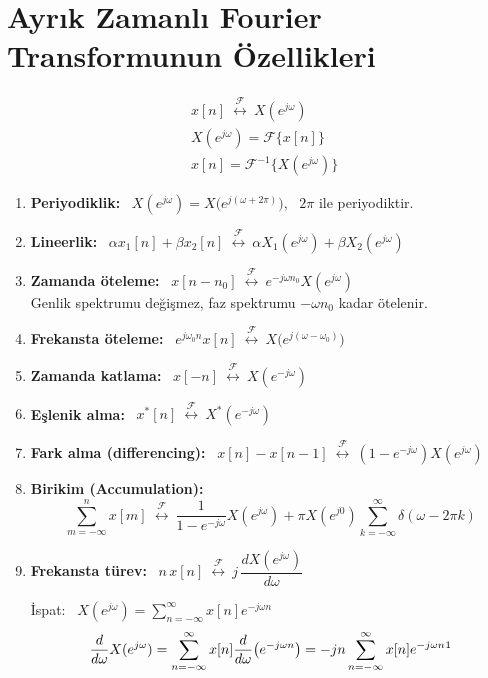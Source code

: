 \documentclass[11pt,a4paper]{article}
\begin{document}
\section{Ayrık Zamanlı Fourier Transformunun Özellikleri}
\begin{align*}
  &x[n]\ \overset{\mathcal{F}}{\longleftrightarrow}\ X(e^{j\omega})\\
  &X(e^{j\omega})=\mathcal{F}\{x[n]\}\\
  &x[n]=\mathcal{F}^{-1}\{X(e^{j\omega})\}
\end{align*}
\begin{enumerate}[label=\arabic*)]
  \item \textbf{Periyodiklik:} \ $X(e^{j\omega})=X\bigl(e^{j(\omega+2\pi)}\bigr)$, \ $2\pi$ ile periyodiktir.
  \item \textbf{Lineerlik:} \ $\alpha x_1[n]+\beta x_2[n]\ \overset{\mathcal{F}}{\longleftrightarrow}\ \alpha X_1(e^{j\omega})+\beta X_2(e^{j\omega})$
  \item \textbf{Zamanda öteleme:} \ $x[n-n_0]\ \overset{\mathcal{F}}{\longleftrightarrow}\ e^{-j\omega n_0}X(e^{j\omega})$\\
    Genlik spektrumu değişmez, faz spektrumu $-\omega n_0$ kadar ötelenir.
  \item \textbf{Frekansta öteleme:} \ $e^{j\omega_0n}x[n]\ \overset{\mathcal{F}}{\longleftrightarrow}\ X\bigl(e^{j(\omega-\omega_0)}\bigr)$
  \item \textbf{Zamanda katlama:} \ $x[-n]\ \overset{\mathcal{F}}{\longleftrightarrow}\ X(e^{-j\omega})$
  \item \textbf{Eşlenik alma:} \ $x^*[n]\ \overset{\mathcal{F}}{\longleftrightarrow}\ X^*(e^{-j\omega})$
  \item \textbf{Fark alma (differencing):} \ $x[n]-x[n-1]\ \overset{\mathcal{F}}{\longleftrightarrow}\ (1-e^{-j\omega})X(e^{j\omega})$
  \item \textbf{Birikim (Accumulation):}
    \[ \sum_{m=-\infty}^{n}x[m]\ \overset{\mathcal{F}}{\longleftrightarrow}\ \frac{1}{1-e^{-j\omega}}X(e^{j\omega})+\pi X(e^{j0})\sum_{k=-\infty}^{\infty}\delta(\omega-2\pi k) \]
  \item \textbf{Frekansta türev:} \ $n\,x[n]\ \overset{\mathcal{F}}{\longleftrightarrow}\ j\,\dfrac{dX(e^{j\omega})}{d\omega}$\par
    İspat: \ $X(e^{j\omega})=\displaystyle\sum_{n=-\infty}^{\infty}x[n]e^{-j\omega n}$
    \[ \frac{d}{d\omega}X(e^{j\omega})=\sum_{n=-\infty}^{\infty}x[n]\frac{d}{d\omega}\bigl(e^{-j\omega n}\bigr)=-jn\sum_{n=-\infty}^{\infty}x[n]e^{-j\omega n}\text{\footnotemark} \]

\end{enumerate}
\end{document}
